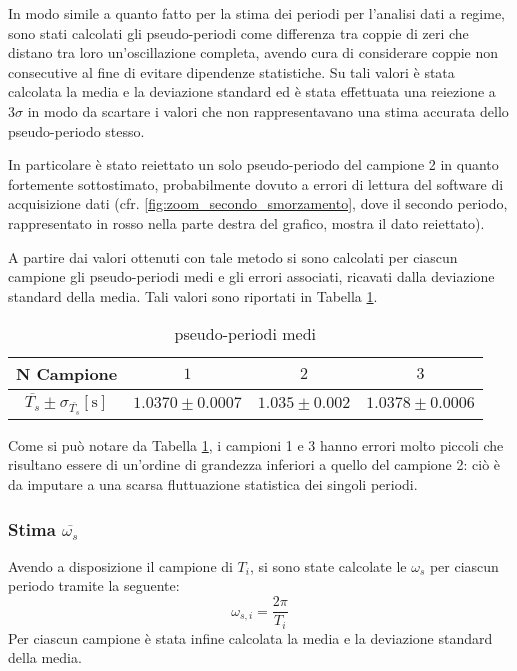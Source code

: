 \documentclass[a4paper,11pt,oneside]{article}
\begin{document}
In modo simile a quanto fatto per la stima dei periodi per l'analisi dati a regime, sono stati calcolati gli pseudo-periodi come differenza tra coppie di zeri che distano tra loro un'oscillazione completa, avendo cura di considerare coppie non consecutive al fine di evitare dipendenze statistiche. Su tali valori è stata calcolata la media e la deviazione standard ed è stata effettuata una reiezione a $3\sigma$ in modo da scartare i valori che non rappresentavano una stima accurata dello pseudo-periodo stesso.

In particolare è stato reiettato un solo pseudo-periodo del campione 2 in quanto fortemente sottostimato, probabilmente dovuto a errori di lettura del software di acquisizione dati (cfr. \ref{fig:zoom_secondo_smorzamento}, dove il secondo periodo, rappresentato in rosso nella parte destra del grafico, mostra il dato reiettato).

A partire dai valori ottenuti con tale metodo si sono calcolati per ciascun campione gli pseudo-periodi medi e gli errori associati, ricavati dalla deviazione standard della media. Tali valori sono riportati in Tabella \ref{tab:pseudo-periodi_medi}.

\begin{table}[h!]
    \centering
    \begin{tabular}{|c|c|c|c|}
        \hline
        \textbf{N Campione} & $1$ & $2$ & $3$\\ \hline
        \rowcolor[rgb]{0.85,0.85,0.85}\textbf{$\overline{T_{s}}\pm \sigma_{\overline{T_{s}}} [\si{\second}]$} & $1.0370\pm0.0007$ & $1.035\pm0.002$ & $1.0378\pm0.0006$\\ \hline
    \end{tabular}
    \caption{pseudo-periodi medi}
    \label{tab:pseudo-periodi_medi}
\end{table}

Come si può notare da Tabella \ref{tab:pseudo-periodi_medi}, i campioni 1 e 3 hanno errori molto piccoli che risultano essere di un'ordine di grandezza inferiori a quello del campione 2: ciò è da imputare a una scarsa fluttuazione statistica dei singoli periodi.

\subsubsection{Stima $\overline{\omega_s}$}
Avendo a disposizione il campione di $T_{i}$, si sono state calcolate le $\omega_s$ per ciascun periodo tramite la seguente:
\begin{equation*}
    \omega_{s,i} = \frac{2\pi}{T_i}
\end{equation*}
Per ciascun campione è stata infine calcolata la media e la deviazione standard della media.
\end{document}
